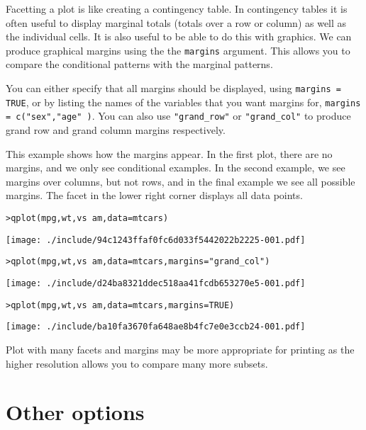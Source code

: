 Facetting a plot is like creating a contingency table.  In contingency tables it is often useful to display marginal totals (totals over a row or column) as well as the individual cells.  It is also useful to be able to do this with graphics.  We can produce graphical margins using the the {\tt margins} argument.  This allows you to compare the conditional patterns with the marginal patterns.

You can either specify that all margins should be displayed, using {\tt margins = TRUE}, or by listing the names of the variables that you want margins for, {\tt margins = c("sex","age" )}.  You can also use {\tt "grand\_row"} or {\tt "grand\_col"} to produce grand row and grand column margins respectively.

This example shows how the margins appear.  In the first plot, there are no margins, and we only see conditional examples.  In the second example, we see margins over columns, but not rows, and in the final example we see all possible margins.  The facet in the lower right corner displays all data points.

\begin{alltt}
> qplot(mpg, wt, vs ~ am, data = mtcars)
\end{alltt}
\texttt{[image: ./include/94c1243ffaf0fc6d033f5442022b2225-001.pdf]}
\begin{alltt}

> qplot(mpg, wt, vs ~ am, data = mtcars, margins = "grand_col")
\end{alltt}
\texttt{[image: ./include/d24ba8321ddec518aa41fcdb653270e5-001.pdf]}
\begin{alltt}

> qplot(mpg, wt, vs ~ am, data = mtcars, margins = TRUE)
\end{alltt}
\texttt{[image: ./include/ba10fa3670fa648ae8b4fc7e0e3ccb24-001.pdf]}
\begin{alltt}

\end{alltt}

Plot with many facets and margins may be more appropriate for printing as the higher resolution allows you to compare many more subsets.

\section{Other options}\label{sec:other_options}

